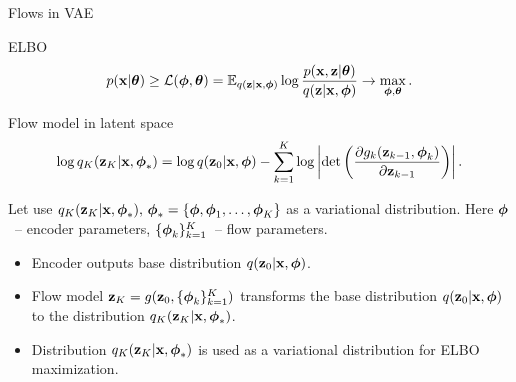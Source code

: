 \begin{frame}{Flows in VAE}
\begin{block}{ELBO}
	\vspace{-0.3cm}
	\[
	p(\mathbf{x} | \boldsymbol{\theta}) \geq \mathcal{L} (\boldsymbol{\phi}, \boldsymbol{\theta})  = \mathbb{E}_{q(\mathbf{z} | \mathbf{x}, \boldsymbol{\phi})} \log \frac{p(\mathbf{x}, \mathbf{z} | \boldsymbol{\theta})}{q(\mathbf{z}| \mathbf{x}, \boldsymbol{\phi})} \rightarrow \max_{\boldsymbol{\phi}, \boldsymbol{\theta}}.
	\]
	\vspace{-0.5cm}
\end{block}
\begin{block}{Flow model in latent space}
	\vspace{-0.7cm}
	\[
	\log q_K(\mathbf{z}_K | \mathbf{x}, \boldsymbol{\phi}_*) = \log q(\mathbf{z}_0 | \mathbf{x}, \boldsymbol{\phi}) - \sum_{k=1}^K \log \left| \det \left( \frac{\partial g_k(\mathbf{z}_{k - 1}, \boldsymbol{\phi}_k)}{\partial \mathbf{z}_{k-1}} \right) \right|.
	\]
	\vspace{-0.5cm}
\end{block}
Let use $q_K(\mathbf{z}_K | \mathbf{x}, \boldsymbol{\phi}_*), \, \boldsymbol{\phi}_* = \{\boldsymbol{\phi}, \boldsymbol{\phi}_1, \dots, \boldsymbol{\phi}_K\}$ as a variational distribution. Here $\boldsymbol{\phi}$~-- encoder parameters, $\{\boldsymbol{\phi}_k\}_{k=1}^K$~-- flow parameters.

\begin{itemize}
	\item Encoder outputs base distribution $q(\mathbf{z}_0 | \mathbf{x}, \boldsymbol{\phi})$.
	\item Flow model $\mathbf{z}_K = g(\mathbf{z}_0, \{\boldsymbol{\phi}_k\}_{k=1}^K)$ transforms the base distribution $q(\mathbf{z}_0 | \mathbf{x}, \boldsymbol{\phi})$ to the distribution $q_K(\mathbf{z}_K | \mathbf{x}, \boldsymbol{\phi}_*)$.
	\item Distribution $q_K(\mathbf{z}_K | \mathbf{x}, \boldsymbol{\phi}_*)$ is used as a variational distribution for ELBO maximization.
\end{itemize}

\end{frame}

